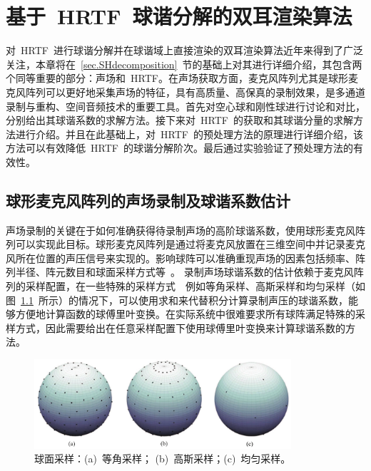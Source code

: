%
%
%
%

\chapter{基于~HRTF~球谐分解的双耳渲染算法} \label{chapter.HRTF}

对~HRTF~进行球谐分解并在球谐域上直接渲染的双耳渲染算法近年来得到了广泛关注，本章将在~\ref{sec.SHdecomposition}~节的基础上对其进行详细介绍，其包含两个同等重要的部分：声场和~HRTF。在声场获取方面，麦克风阵列尤其是球形麦克风阵列可以更好地采集声场的特征，具有高质量、高保真的录制效果，是多通道录制与重构、空间音频技术的重要工具。首先对空心球和刚性球进行讨论和对比，分别给出其球谐系数的求解方法。接下来对~HRTF~的获取和其球谐分量的求解方法进行介绍。并且在此基础上，对~HRTF~的预处理方法的原理进行详细介绍，该方法可以有效降低~HRTF~的球谐分解阶次。最后通过实验验证了预处理方法的有效性。

\section{球形麦克风阵列的声场录制及球谐系数估计}\label{section_microphone_array_coe}
声场录制的关键在于如何准确获得待录制声场的高阶球谐系数，使用球形麦克风阵列可以实现此目标。球形麦克风阵列是通过将麦克风放置在三维空间中并记录麦克风所在位置的声压信号来实现的。影响球阵可以准确重现声场的因素包括频率、阵列半径、阵元数目和球面采样方式等~。
录制声场球谐系数的估计依赖于麦克风阵列的采样配置，在一些特殊的采样方式~~例如等角采样、高斯采样和均匀采样（如图~\ref{fig:sampling}~所示）的情况下，可以使用求和来代替积分计算录制声压的球谐系数，能够方便地计算函数的球傅里叶变换。在实际系统中很难要求所有球阵满足特殊的采样方式，因此需要给出在任意采样配置下使用球傅里叶变换来计算球谐系数的方法。

\begin{figure}[!h]
\centering
\includegraphics[width=0.85\textwidth]{figure/chapter3/sampling-eps.pdf}
\caption{ 球面采样：(a)~等角采样；
(b)~高斯采样；(c)~均匀采样。}\label{fig:sampling}
\end{figure}

